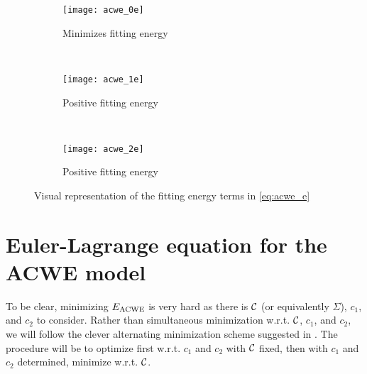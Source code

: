 \begin{figure}
	\centering
	\begin{subfigure}[b]{0.31\textwidth}
		\texttt{[image: acwe\_0e]}
		\caption{Minimizes fitting energy}
		\label{fig:gull}
	\end{subfigure}
	~ %
	\begin{subfigure}[b]{0.31\textwidth}
		\texttt{[image: acwe\_1e]}
		\caption{Positive fitting energy}
		\label{fig:tiger}
	\end{subfigure}
	~ %
	\begin{subfigure}[b]{0.31\textwidth}
		\texttt{[image: acwe\_2e]}
		\caption{Positive fitting energy}
		\label{fig:mouse}
	\end{subfigure}
	\caption{Visual representation of the fitting energy terms in \eqref{eq:acwe_e}}
	\label{fig:fitting}
\end{figure}


\section{Euler-Lagrange equation for the ACWE model}
To be clear, minimizing $E_\textrm{ACWE}$ is very hard as there is $\mathcal{C}$ (or equivalently $\Sigma$), $c_1$, and $c_2$ to consider. Rather than simultaneous minimization w.r.t. $\mathcal{C}$, $c_1$, and $c_2$, we will follow the clever alternating minimization scheme suggested in \cite{chan2001active}. The procedure will be to optimize first w.r.t. $c_1$ and $c_2$ with $\mathcal{C}$ fixed, then with $c_1$ and $c_2$ determined, minimize w.r.t. $\mathcal{C}$.

